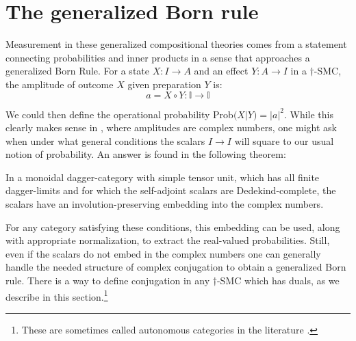\section{The generalized Born rule}

Measurement in these generalized compositional theories comes from a statement connecting probabilities and inner products in a sense that approaches a generalized Born Rule. For a state $X:I\to A$ and an effect $Y:A\to I$ in a $\dagger$-SMC, the amplitude of outcome $X$ given preparation $Y$ is:
\begin{equation}
a = X\circ Y:\mathbb{I}\to\mathbb{I}
\end{equation}


\noindent We could then define the operational probability Prob$(X|Y)=|a|^2$. While this clearly makes sense in , where amplitudes are complex numbers, one might ask when under what general conditions the scalars $I\to I$ will square to our usual notion of probability. An answer is found in the following theorem:
\begin{theorem}{\cite[Thm 4.2]{vicary2011completeness}}
In a monoidal dagger-category with simple tensor unit, which has all finite dagger-limits and for which the self-adjoint scalars are Dedekind-complete, the scalars have an involution-preserving embedding into the complex numbers.
\end{theorem}
\noindent For any category satisfying these conditions, this embedding can be used, along with appropriate normalization, to extract the real-valued probabilities. Still, even if the scalars do not embed in the complex numbers one can generally handle the needed structure of complex conjugation to obtain a generalized Born rule. There is a way to define conjugation in any $\dagger$-SMC which has duals, as we describe in this section.\footnote{These are sometimes called autonomous categories in the literature \cite{joyal1993braided,selinger2011survey}.}

